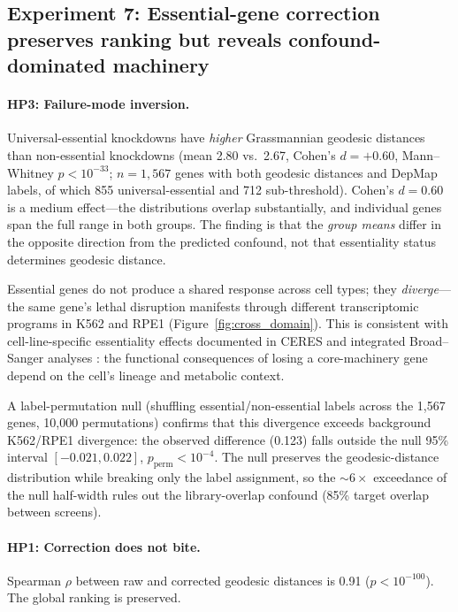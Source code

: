 \documentclass{article}
\begin{document}
\subsection{Experiment 7: Essential-gene correction preserves ranking
but reveals confound-dominated machinery}

\paragraph{HP3: Failure-mode inversion.}
Universal-essential knockdowns have \emph{higher} Grassmannian geodesic
distances than non-essential knockdowns (mean 2.80 vs.\ 2.67, Cohen's $d =
+0.60$, Mann--Whitney $p < 10^{-33}$; $n = 1{,}567$ genes with both
geodesic distances and DepMap labels, of which 855 universal-essential and
712 sub-threshold). Cohen's $d = 0.60$ is a medium effect---the
distributions overlap substantially, and individual genes span the full
range in both groups. The finding is that the \emph{group means} differ
in the opposite direction from the predicted confound, not that essentiality
status determines geodesic distance.

Essential genes do not produce a shared response across cell types; they
\emph{diverge}---the same gene's lethal disruption manifests through
different transcriptomic programs in K562 and RPE1
(Figure~\ref{fig:cross_domain}). This is consistent with cell-line-specific
essentiality effects documented in CERES \citep{meyers2017ceres} and
integrated Broad--Sanger analyses \citep{pacini2021integrated}: the
functional consequences of losing a core-machinery gene depend on
the cell's lineage and metabolic context.

A label-permutation null (shuffling essential/non-essential labels across
the 1{,}567 genes, 10{,}000 permutations) confirms that this divergence
exceeds background K562/RPE1 divergence: the observed difference (0.123)
falls outside the null 95\% interval $[-0.021, 0.022]$,
$p_{\text{perm}} < 10^{-4}$. The null preserves the geodesic-distance
distribution while breaking only the label assignment, so the ${\sim}6\times$
exceedance of the null half-width rules out the library-overlap confound
(85\% target overlap between screens).

\paragraph{HP1: Correction does not bite.}
Spearman $\rho$ between raw and corrected geodesic distances is 0.91
($p < 10^{-100}$). The global ranking is preserved.
\end{document}
